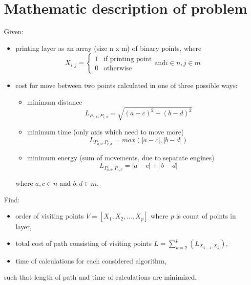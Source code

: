 \documentclass[titlepage]{article}
\begin{document}
\section{Mathematic description of problem}
Given:
\begin{itemize}
\item printing layer as an array (size n x m) of binary points, where
\begin{equation}
\label{layer}
X_{i,j}=\left\{ \begin{array}{rl}
 1 &\mbox{if printing point} \\
 0 &\mbox{otherwise}
       \end{array} \right. \mbox{and} i \in n, j \in m
\end{equation}
\item cost for move between two points calculated in one of three possible ways:
\begin{itemize}
\item minimum distance
\begin{equation}
\label{distance_cost}
L_{P_{a,b}, P_{c,d}} = \sqrt{(a-c)^2+(b-d)^2}
\end{equation}
\item minimum time (only axis which need to move more)
\begin{equation}
\label{time_cost}
L_{P_{a,b}, P_{c,d}} = max(|a-c|, |b-d|)
\end{equation}
\item minimum energy (sum of movements, due to separate engines)
\begin{equation}
\label{energy_cost}
L_{P_{a,b}, P_{c,d}} = |a-c|+|b-d|
\end{equation}
\end{itemize}
where $a, c \in n$ and $b, d \in m$.
\end{itemize}

Find:
\begin{itemize}
\item order of visiting points $V=[X_1, X_2, ..., X_p]$ where \textit{p} is count of points in layer,
\item total cost of path consisting of visiting points $L=\sum\limits_{k=2}^p (L_{X_{k-1}, X_k})$,
\item time of calculations for each considered algorithm,
\end{itemize}
such that length of path and time of calculations are minimized.

\pagebreak
\end{document}
